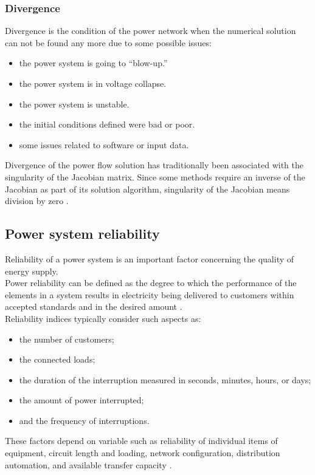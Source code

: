 \subsubsection{Divergence}
Divergence is the condition of the power network when the numerical solution can not be found any more due to some possible issues:

\begin{itemize}
    \item the power system is going to “blow-up.”
    \item the power system is in voltage collapse.
    \item the power system is unstable.
    \item the initial conditions defined were bad or poor.
    \item some issues related to software or input data.
\end{itemize}

Divergence of the power flow solution has traditionally been associated with the singularity of the Jacobian matrix. Since some methods require an inverse of the Jacobian as part of its solution algorithm, singularity of the Jacobian means division by zero \cite{eps}.


\subsection{Power system reliability}
\label{sec:psr}
Reliability of a power system is an important factor concerning the quality of energy supply. \\
Power reliability can be defined as the degree to which the performance of the elements in a system results in electricity being delivered to customers within accepted standards and in the desired amount \cite{MPRPQ}. \\
Reliability indices typically consider such aspects as:
\begin{itemize}
 \item the number of customers;
 \item the connected loads;
 \item the duration of the interruption measured in seconds, minutes, hours, or days;
 \item the amount of power interrupted;  
 \item and the frequency of interruptions.
\end{itemize}

These factors depend on variable such as reliability of individual items of equipment, circuit length and loading, network configuration, distribution automation, and available transfer capacity \cite{EDNdesign}. \\

